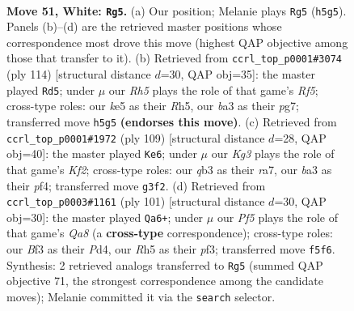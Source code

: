 \documentclass[11pt]{article}
\begin{document}
\clearpage

\begin{figure}[p]\centering
\begin{subfigure}{0.46\textwidth}\centering
\resizebox{\linewidth}{!}{%
\newchessgame
\chessboard[
  setfen={8/p7/8/1p2kP1R/8/bq3BK1/8/8 w - - 4 51},
  showmover=false,
  pgfstyle=straightmove, color=movearrow, markmove={h5-g5}
]}
\caption{}
\end{subfigure}\hfill
\begin{subfigure}{0.46\textwidth}\centering
\resizebox{\linewidth}{!}{%
\newchessgame
\chessboard[
  setfen={6k1/6p1/8/5R1R/8/7p/q2BK3/8 w - - 8 58},
  showmover=false,
  pgfstyle=straightmove, color=movearrow, markmove={f5-d5}
]}
\caption{}
\end{subfigure}
\\[4pt]
\begin{subfigure}{0.46\textwidth}\centering
\resizebox{\linewidth}{!}{%
\newchessgame
\chessboard[
  setfen={8/R3bk2/1p6/8/1r3P2/3B2K1/8/8 b - - 0 55},
  showmover=false,
  pgfstyle=straightmove, color=movearrow, markmove={f7-e6}
]}
\caption{}
\end{subfigure}\hfill
\begin{subfigure}{0.46\textwidth}\centering
\resizebox{\linewidth}{!}{%
\newchessgame
\chessboard[
  setfen={8/8/6K1/4Q3/3p4/1k1P1PP1/8/q7 b - - 0 51},
  showmover=false,
  pgfstyle=straightmove, color=movearrow, markmove={a1-a6}
]}
\caption{}
\end{subfigure}
\caption{\textbf{Move 51, White: \texttt{Rg5}.} (a) Our position; Melanie plays \texttt{Rg5} (\texttt{h5g5}). Panels (b)--(d) are the retrieved master positions whose correspondence most drove this move (highest QAP objective among those that transfer to it). (b) Retrieved from \texttt{ccrl\_top\_p0001\#3074} (ply 114) [structural distance $d$=30, QAP obj=35]: the master played \texttt{Rd5}; under $\mu$ our \emph{Rh5} plays the role of that game's \emph{Rf5}; cross-type roles: our \emph{k}e5 as their \emph{R}h5, our \emph{b}a3 as their \emph{p}g7; transferred move \texttt{h5g5} \textbf{(endorses this move)}. (c) Retrieved from \texttt{ccrl\_top\_p0001\#1972} (ply 109) [structural distance $d$=28, QAP obj=40]: the master played \texttt{Ke6}; under $\mu$ our \emph{Kg3} plays the role of that game's \emph{Kf2}; cross-type roles: our \emph{q}b3 as their \emph{r}a7, our \emph{b}a3 as their \emph{p}f4; transferred move \texttt{g3f2}. (d) Retrieved from \texttt{ccrl\_top\_p0003\#1161} (ply 101) [structural distance $d$=30, QAP obj=30]: the master played \texttt{Qa6+}; under $\mu$ our \emph{Pf5} plays the role of that game's \emph{Qa8} (a \textbf{cross-type} correspondence); cross-type roles: our \emph{B}f3 as their \emph{P}d4, our \emph{R}h5 as their \emph{p}f3; transferred move \texttt{f5f6}. Synthesis: 2 retrieved analogs transferred to \texttt{Rg5} (summed QAP objective 71, the strongest correspondence among the candidate moves); Melanie committed it via the \texttt{search} selector.}
\label{fig:thought-m100}
\end{figure}
\end{document}

